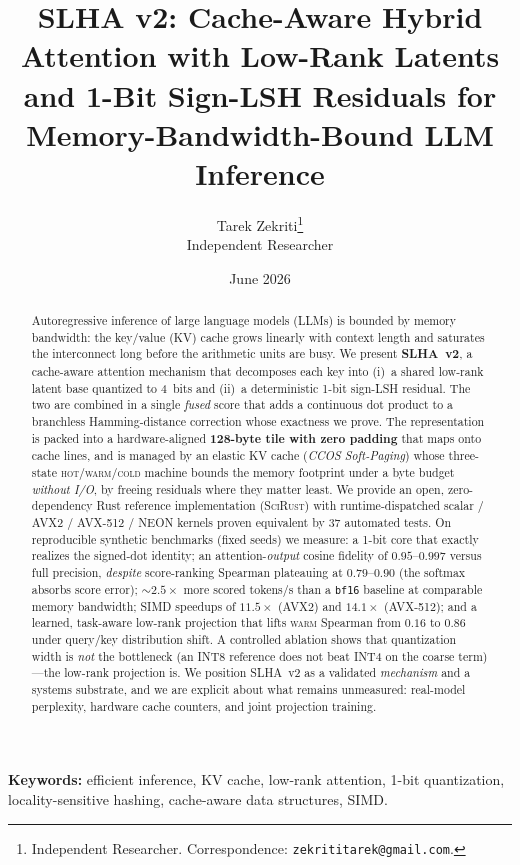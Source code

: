 \documentclass[11pt]{article}
\title{\textbf{SLHA v2: Cache-Aware Hybrid Attention with Low-Rank
Latents and 1-Bit Sign-LSH Residuals for Memory-Bandwidth-Bound
LLM Inference}}
\author{
  Tarek Zekriti\thanks{Independent Researcher. Correspondence:
  \texttt{zekrititarek@gmail.com}.}\\
  \small Independent Researcher
}
\date{June 2026}
\theoremstyle{plain}
\theoremstyle{definition}
\begin{document}
\maketitle

\begin{abstract}
\noindent
Autoregressive inference of large language models (LLMs) is bounded by
memory bandwidth: the key/value (KV) cache grows linearly with context
length and saturates the interconnect long before the arithmetic units
are busy. We present \textbf{SLHA~v2}, a cache-aware attention mechanism
that decomposes each key into (i)~a shared low-rank latent base
quantized to 4~bits and (ii)~a deterministic 1-bit sign-LSH residual.
The two are combined in a single \emph{fused} score that adds a
continuous dot product to a branchless Hamming-distance correction whose
exactness we prove. The representation is packed into a hardware-aligned
\textbf{128-byte tile with zero padding} that maps onto cache lines, and
is managed by an elastic KV cache (\emph{CCOS Soft-Paging}) whose
three-state \textsc{hot}/\textsc{warm}/\textsc{cold} machine bounds the
memory footprint under a byte budget \emph{without I/O}, by freeing
residuals where they matter least. We provide an open, zero-dependency
Rust reference implementation (\textsc{SciRust}) with
runtime-dispatched scalar / AVX2 / AVX-512 / NEON kernels proven
equivalent by 37 automated tests. On reproducible synthetic benchmarks
(fixed seeds) we measure: a 1-bit core that exactly realizes the
signed-dot identity; an attention-\emph{output} cosine fidelity of
$0.95$--$0.997$ versus full precision, \emph{despite} score-ranking
Spearman plateauing at $0.79$--$0.90$ (the softmax absorbs score error);
$\sim\!2.5\times$ more scored tokens/s than a \texttt{bf16} baseline at
comparable memory bandwidth; SIMD speedups of $11.5\times$ (AVX2) and
$14.1\times$ (AVX-512); and a learned, task-aware low-rank projection
that lifts \textsc{warm} Spearman from $0.16$ to $0.86$ under query/key
distribution shift. A controlled ablation shows that quantization width
is \emph{not} the bottleneck (an INT8 reference does not beat INT4 on the
coarse term)---the low-rank projection is. We position SLHA~v2 as a
validated \emph{mechanism} and a systems substrate, and we are explicit
about what remains unmeasured: real-model perplexity, hardware cache
counters, and joint projection training.
\end{abstract}

\noindent\textbf{Keywords:} efficient inference, KV cache, low-rank
attention, 1-bit quantization, locality-sensitive hashing, cache-aware
data structures, SIMD.
\end{document}
